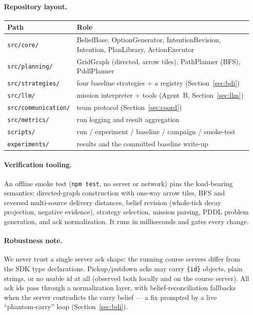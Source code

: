 \paragraph{Repository layout.}
\begin{center}\small
\begin{tabular}{@{}ll@{}}
\toprule
Path & Role \\
\midrule
\texttt{src/core/} & BeliefBase, OptionGenerator, IntentionRevision, Intention, PlanLibrary, ActionExecutor \\
\texttt{src/planning/} & GridGraph (directed, arrow tiles), PathPlanner (BFS), PddlPlanner \\
\texttt{src/strategies/} & four baseline strategies $+$ a registry (Section~\ref{sec:bdi}) \\
\texttt{src/llm/} & mission interpreter + tools (Agent~B, Section~\ref{sec:llm}) \\
\texttt{src/communication/} & team protocol (Section~\ref{sec:coord}) \\
\texttt{src/metrics/} & run logging and result aggregation \\
\texttt{scripts/} & run / experiment / baseline / campaign / smoke-test \\
\texttt{experiments/} & results and the committed baseline write-up \\
\bottomrule
\end{tabular}
\end{center}

\paragraph{Verification tooling.} An offline smoke test (\texttt{npm test}, no
server or network) pins the load-bearing semantics: directed-graph
construction with one-way arrow tiles, BFS and reversed multi-source delivery
distances, belief revision (whole-tick decay projection, negative evidence),
strategy selection, mission parsing, PDDL problem generation, and ack
normalization. It runs in milliseconds and gates every change.

\paragraph{Robustness note.} We never trust a single server ack shape: the
running course servers differ from the SDK type declarations. Pickup/putdown
acks may carry \texttt{\{id\}} objects, plain strings, or no usable id at all
(observed both locally and on the course server). All ack ids pass through a
normalization layer, with belief-reconciliation fallbacks when the server
contradicts the carry belief --- a fix prompted by a live ``phantom-carry''
loop (Section~\ref{sec:bdi}).
